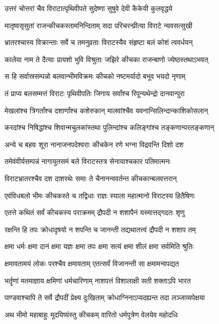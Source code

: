 \twolineshloka
{उत्तरं चोत्तरां चैव विराटात्पृथिवीपते}
{सुदेष्णा सुषुवे देवी कैकेयी कुलवृद्धये}


\twolineshloka
{मातृष्वसृसुतां राजन्कीचकस्तामनिन्दिताम्}
{सदा परिचरन्प्रीत्या विराटे न्यवसत्सुखी}


\twolineshloka
{भ्रातरश्चास्य विक्रान्ताः सर्वे च तमनुव्रताः}
{विराटस्यैव संहृष्टा बलं कोशं त्ववर्धयन्}


\twolineshloka
{कालेया नाम ते दैत्याः प्रायशो भुवि विश्रुताः}
{जझिरे कीचका राजन्बाणो ज्येष्ठस्तथाऽभवत्}


\twolineshloka
{स हि सर्वास्रसम्पन्नो बलवान्भीमविक्रमः}
{कीचको नष्टमर्यादो बभूव भयदो नृणाम्}


\twolineshloka
{तं प्राप्य बलसम्मत्तं विराटः पृथिवीपतिः}
{जिगाय सर्वांश्च रिपून्यथेन्द्रो दानवान्पुरा}


\twolineshloka
{मेखलांश्च त्रिगर्तांश्च दशार्णांश्च कशेरुकान्}
{मालवांश्चैव यवनान्सिलिन्दान्काशिकोसलान्}


\twolineshloka
{करदांश्च निषिद्धांश्च शिवान्मचुलकांस्तथा}
{पुलिन्दांश्च कलिङ्गांश्च तङ्कणान्परतङ्कणान्}


\twolineshloka
{अन्ये च बहवः शूरा नानाजनपदेश्वराः}
{कीचकेन रणे भग्ना विद्रवन्ति दिशो दश}


\twolineshloka
{तमेवंवीर्यसम्पन्नं नागायुतसमं बले}
{विराटस्तत्र सेनायाश्चकार पतिमात्मनः}


\twolineshloka
{विराटभ्रातरश्चैव दश दाशरथेः समाः}
{ते चैनानन्ववर्तन्त कीचकान्बलवत्तरान्}


\twolineshloka
{एवंविधबलो भीमः कीचकस्ते च तद्विधाः}
{राज्ञः स्याला महात्मानो विराटस्य हितैषिणः}


\twolineshloka
{एतत्ते कथितं सर्वं कीचकस्य पराक्रमम्}
{द्रौपदी न शशापैनं यस्मात्तद्गदतः शृणु}


\twolineshloka
{रक्षन्ति हि तपः क्रोधादृषयो न शपन्ति च}
{जानन्ती तद्यथातत्त्वं द्रौपदी न शशाप तम्}


\twolineshloka
{क्षमा धर्मः क्षमा दानं क्षमा यज्ञः क्षमा तपः}
{क्षमा सत्यं क्षमा शीलं क्षमा सर्वमिति श्रुतिः}


\twolineshloka
{क्षमावतामयं लोकः परश्चैव क्षमावताम्}
{एतत्सर्वं विजानन्ती सा क्षमामन्वपद्यत}


\twolineshloka
{भर्तॄणां मतमाज्ञाय क्षमिणां धर्मचारिणाम्}
{नाशपत्तं विशालाक्षी सती शक्ताऽपि भारत}


\twolineshloka
{पाण्डवाश्चापि ते सर्वे द्रौपदीं प्रेक्ष्य दुःखिताम्}
{क्रोधाग्निनाऽप्यदह्यन्त तदा लञ्जाव्यपेक्षया}


\twolineshloka
{अथ भीमो महाबाहुः मूदयिष्यंस्तु कीचकम्}
{वारितो धर्मपुत्रेण वेलयेव महोदधिः}


